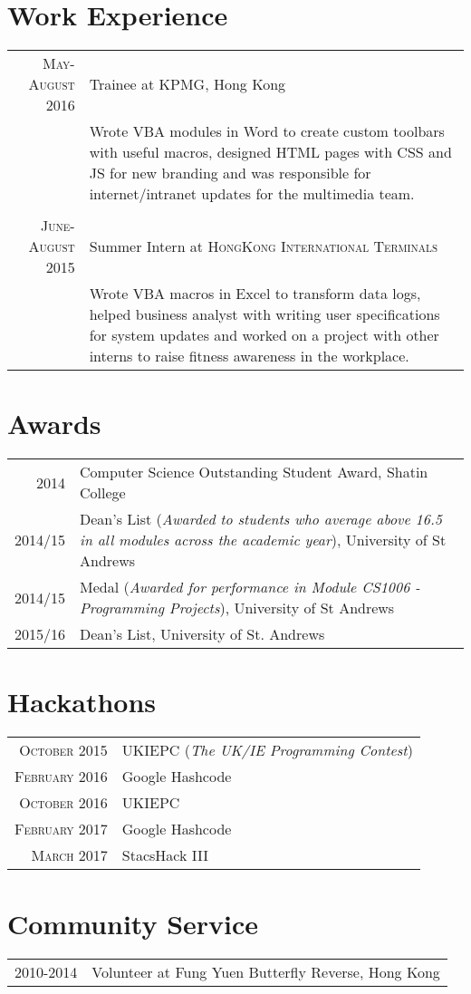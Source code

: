 \documentclass{article}
\begin{document}
\section*{Work Experience}
\begin{tabular}{r|p{14cm}}

\textsc{May-August 2016} & Trainee at \textsc{KPMG}, Hong Kong \\
 
&\footnotesize{Wrote VBA modules in Word to create custom toolbars with useful macros, designed HTML pages with CSS and JS for new branding and was responsible for internet/intranet updates for the multimedia team.}\\\multicolumn{2}{c}{} \\


\textsc{June-August 2015} & Summer Intern at \textsc{HongKong International Terminals} \\

&\footnotesize{Wrote VBA macros in Excel to transform data logs, helped business analyst with writing user specifications for system updates and worked on a project with other interns to raise fitness awareness in the workplace.}
\end{tabular}

\section*{Awards}
\begin{tabular}{r|p{16cm}}

\textsc{2014} & Computer Science Outstanding Student Award, Shatin College \\

\textsc{2014/15} & Dean’s List (\textit{Awarded to students who average above 16.5 in all modules across the academic year}), University of St Andrews\\

\textsc{2014/15} & Medal (\textit{Awarded for performance in Module CS1006 - Programming Projects}), University of St Andrews\\

\textsc{2015/16} & Dean's List, University of St. Andrews \\

\end{tabular}

\section*{Hackathons}
\begin{tabular}{r|p{14cm}}
\textsc{October 2015} & UKIEPC (\textit{The UK/IE Programming Contest})\\
\textsc{February 2016} & Google Hashcode \\
\textsc{October 2016} & UKIEPC \\
\textsc{February 2017} & Google Hashcode \\
\textsc{March 2017} & StacsHack III \\
\end{tabular}
\section*{Community Service}
\begin{tabular}{r|p{14cm}}
\textsc{2010-2014} & Volunteer at Fung Yuen Butterfly Reverse, Hong Kong \\
\end{tabular}
\end{document}
